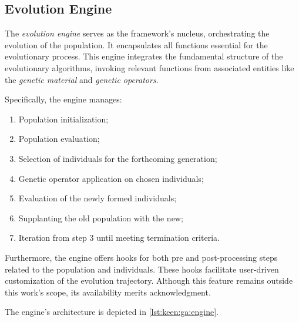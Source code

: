 \subsection{Evolution Engine}
\label{sec:keen:ga:engine}

  The \emph{evolution engine} serves as the framework's nucleus, orchestrating the
  evolution of the population.
  It encapsulates all functions essential for the evolutionary process.
  This engine integrates the fundamental structure of the evolutionary algorithms,
  invoking relevant functions from associated entities like the 
  \emph{genetic material} and \emph{genetic operators}.

  Specifically, the engine manages:

  \begin{enumerate}
    \item Population initialization;
    \item Population evaluation;
    \item Selection of individuals for the forthcoming generation;
    \item Genetic operator application on chosen individuals;
    \item Evaluation of the newly formed individuals;
    \item Supplanting the old population with the new;
    \item Iteration from step 3 until meeting termination criteria.
  \end{enumerate}

  Furthermore, the engine offers hooks for both pre and post-processing steps
  related to the population and individuals.
  These hooks facilitate user-driven customization of the evolution trajectory.
  Although this feature remains outside this work's scope, its availability merits
  acknowledgment.

  The engine's architecture is depicted in \vref{lst:keen:ga:engine}.

